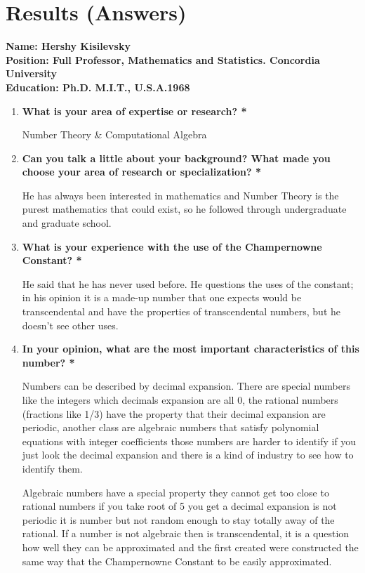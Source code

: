 \documentclass{article}
\begin{document}
\section*{Results (Answers)} %

\textbf{Name: Hershy Kisilevsky} \\
\textbf{Position: Full Professor, Mathematics and Statistics. Concordia University} \\
\textbf{Education: Ph.D. M.I.T., U.S.A.1968} 
\begin{enumerate}
\item\textbf{What is your area of expertise or research?\color{red} *}

Number Theory \& Computational Algebra

\item\textbf{Can you talk a little about your background? What made you choose your area of research or specialization?\color{red} *}

He has always been interested in mathematics and Number Theory is the purest mathematics that could exist, so he followed through undergraduate and graduate school.

\item\textbf{What is your experience with the use of the Champernowne Constant? \color{red} *}

He said that he has never used before. He questions the uses of the constant; in his opinion it is a made-up number that one expects would be transcendental and have the properties of transcendental numbers, but he doesn’t see other uses. 

\item\textbf{In your opinion, what are the most important characteristics of this number? \color{red} *}

Numbers can be described by decimal expansion. There are special numbers like the integers which decimals expansion are all 0, the rational numbers (fractions like 1/3) have the property that their decimal expansion are periodic, another class are algebraic numbers that satisfy polynomial equations with integer coefficients those numbers are harder to identify if you just look the decimal expansion and there is a kind of industry to see how to identify them. 

Algebraic numbers have a special property they cannot get too close to rational numbers if you take root of 5 you get a decimal expansion is not periodic it is number but not random enough to stay totally away of the rational. If a number is not algebraic then is transcendental, it is a question how well they can be approximated and the first created were constructed the same way that the Champernowne Constant to be easily approximated.


\end{enumerate}
\end{document}

